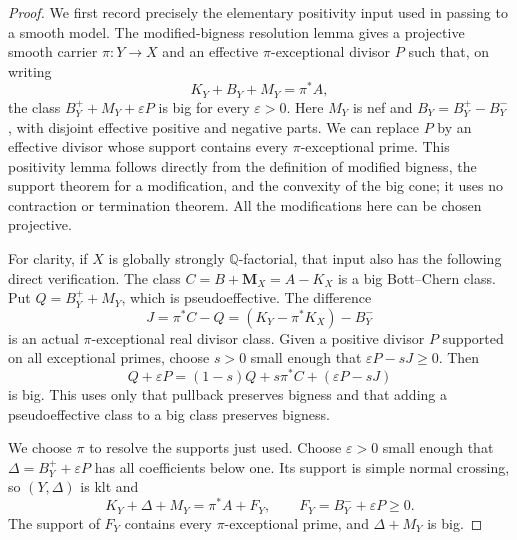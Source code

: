 \begin{proof}
We first record precisely the elementary positivity input used in
passing to a smooth model. The modified-bigness resolution lemma
\cite[Lemma~2.5]{HLX2026} gives a projective smooth carrier
$\pi:Y\to X$ and an effective $\pi$-exceptional divisor $P$ such that,
on writing
\[
 K_Y+B_Y+M_Y=\pi^*A,
\]
the class $B_Y^++M_Y+\varepsilon P$ is big for every
$\varepsilon>0$. Here $M_Y$ is nef and $B_Y=B_Y^+-B_Y^-$, with
disjoint effective positive and negative parts. We can replace $P$ by
an effective divisor whose support contains every $\pi$-exceptional
prime. This positivity lemma follows directly from the definition of
modified bigness, the support theorem for a modification, and the
convexity of the big cone; it uses no contraction or termination theorem.
All the modifications here can be chosen projective.

For clarity, if $X$ is globally strongly $\mathbb Q$-factorial, that
input also has the following direct verification. The class
$C=B+\mathbf M_X=A-K_X$ is a big Bott--Chern class. Put
$Q=B_Y^++M_Y$, which is pseudoeffective. The difference
\[
 J=\pi^*C-Q=(K_Y-\pi^*K_X)-B_Y^-
\]
is an actual $\pi$-exceptional real divisor class. Given a positive
divisor $P$ supported on all exceptional primes, choose $s>0$ small
enough that $\varepsilon P-sJ\geq0$. Then
\[
 Q+\varepsilon P
  =(1-s)Q+s\pi^*C+(\varepsilon P-sJ)
\]
is big. This uses only that pullback preserves bigness and that adding
a pseudoeffective class to a big class preserves bigness.

We choose $\pi$ to resolve the supports just used. Choose
$\varepsilon>0$ small enough that
$\Delta=B_Y^++\varepsilon P$ has all coefficients below one.
Its support is simple normal crossing, so $(Y,\Delta)$ is klt and
\begin{equation}\label{repair:eq:good-model-first-error}
 K_Y+\Delta+M_Y=\pi^*A+F_Y,
 \qquad F_Y=B_Y^-+\varepsilon P\geq0.
\end{equation}
The support of $F_Y$ contains every $\pi$-exceptional prime, and
$\Delta+M_Y$ is big.


\end{proof}
